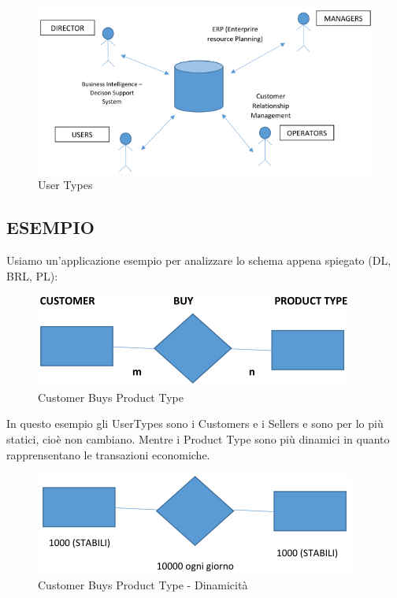 \begin{center}
\begin{figure}[H]
\centering
\includegraphics[scale=0.8]{figures/ut.png}
\caption{User Types} 
\end{figure}
\end{center}

\subsection{ESEMPIO}

Usiamo un’applicazione esempio per analizzare lo schema appena spiegato (DL, BRL, PL):

\begin{center}
\begin{figure}[H]
\centering
\includegraphics[scale=1]{figures/cbuypt.png}
\caption{Customer Buys Product Type} 
\end{figure}
\end{center}

In questo esempio gli UserTypes sono i Customers e i Sellers e sono per lo più statici, cioè non cambiano. Mentre i Product Type sono più dinamici in quanto rapprensentano le transazioni economiche. 

\begin{center}
\begin{figure}[H]
\centering
\includegraphics[scale=1]{figures/cbuypt_alim.png}
\caption{Customer Buys Product Type - Dinamicità} 
\end{figure}
\end{center}

